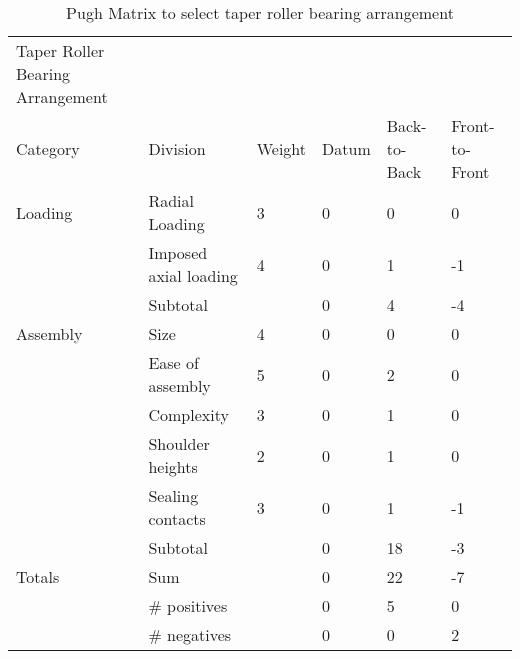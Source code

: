  \begin{table}
\centering
\caption{Pugh Matrix to select taper roller bearing arrangement}
\begin{tabular}{| llllll |} \hline
Taper Roller Bearing Arrangement &  &  &  &  &  & \\
Category & Division & Weight & Datum & Back-to-Back & Front-to-Front & \\
Loading & Radial Loading & 3 & 0 & 0 & 0 & \\
 & Imposed axial loading & 4 & 0 & 1 & -1 & \\
 & Subtotal &  & 0 & 4 & -4 & \\
Assembly & Size & 4 & 0 & 0 & 0 & \\
 & Ease of assembly & 5 & 0 & 2 & 0 & \\
 & Complexity & 3 & 0 & 1 & 0 & \\
 & Shoulder heights & 2 & 0 & 1 & 0 & \\
 & Sealing contacts & 3 & 0 & 1 & -1 & \\
 & Subtotal &  & 0 & 18 & -3 & \\
Totals & Sum &  & 0 & 22 & -7 & \\
 & \# positives &  & 0 & 5 & 0 & \\
 & \# negatives &  & 0 & 0 & 2 & 
 \end{tabular}
\label{tab:pugh_tap}
\end{table}